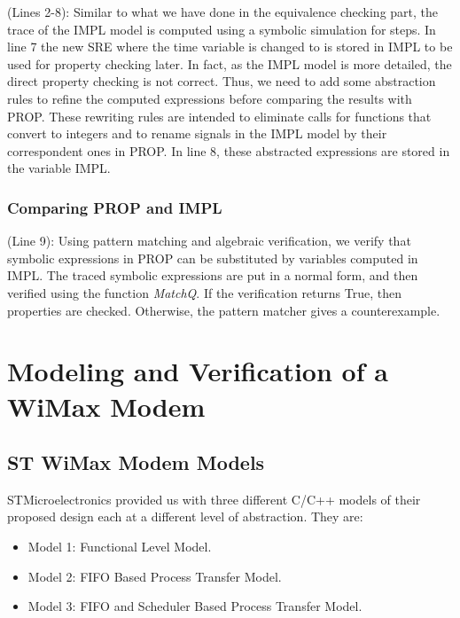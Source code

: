 \documentclass[submission,copyright,creativecommons]{eptcs}
\begin{document}
(Lines 2-8): Similar to what we have done in the equivalence checking part, the trace of the IMPL model is computed using a symbolic simulation for  steps. In line 7 the new SRE where the time variable is changed to  is stored in IMPL to be used for property checking later. In fact, as the IMPL model is more detailed, the direct property checking is not correct. Thus, we need to add some abstraction rules to refine the computed expressions before comparing the results with PROP. These rewriting rules  are intended to eliminate calls for functions that convert to integers and to rename signals in the IMPL model by their correspondent ones in PROP. In line 8, these abstracted expressions are stored in the variable IMPL.

\subsubsection{Comparing PROP and IMPL}

(Line 9): Using pattern matching and algebraic verification, we verify that symbolic expressions in PROP can be substituted by variables computed in IMPL. The traced symbolic expressions are put in a normal form, and then verified using the function \emph{MatchQ}. If the verification returns True, then properties are checked. Otherwise, the pattern matcher gives a counterexample.

\section{Modeling and Verification of a WiMax Modem}

\subsection{ST WiMax Modem Models}  \label{subsection_model}
STMicroelectronics provided us with three different C/C++ models of their proposed design each at a different level of abstraction. They are:
\begin{itemize}
  \item Model 1: Functional Level Model.
  \item Model 2: FIFO Based Process Transfer Model.
  \item Model 3: FIFO and Scheduler Based Process Transfer Model.
\end{itemize}
\end{document}

